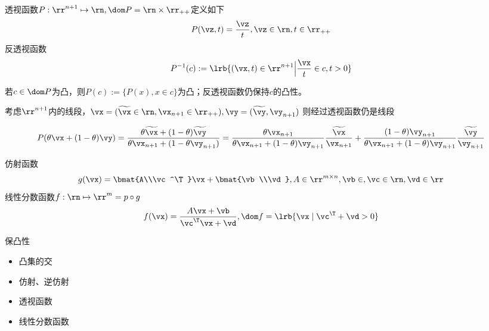 \begin{definition}
透视函数$P:\rr^{n+1}\mapsto\rn,\dom P=\rn\times\rr_{++}$定义如下
\[P(\vz,t)=\dfrac{\vz}{t},\vz\in\rn,t\in\rr_{++}\]
反透视函数
\[P^{-1}(c):=\lrb{(\vx,t)\in\rr^{n+1}\Big|\frac{\vx}{t}\in c,t>0}\]
\end{definition}

若$c\in\dom P$为凸，则$P(c):=\{P(x),x\in c\}$为凸；反透视函数仍保持$c$的凸性。

考虑$\rr^{n+1}$内的线段，$\vx=(\widetilde{\vx}\in\rn,\vx_{n+1}\in\rr_{++}),\vy=(\widetilde{\vy},\vy_{n+1})$
则经过透视函数仍是线段
\begin{analysis}
\[P(\theta \vx+(1-\theta)\vy)=\frac{\theta\widetilde{\vx}+(1-\theta)\widetilde{\vy}}{\theta \vx_{n+1}+(1-\theta \vy_{n+1})}=\frac{\theta \vx_{n+1}}{\theta \vx_{n+1}+(1-\theta)\vy_{n+1}}\frac{\widetilde{\vx}}{\vx_{n+1}}+\frac{(1-\theta)\vy_{n+1}}{\theta \vx_{n+1}+(1-\theta)\vy_{n+1}}\frac{\widetilde{\vy}}{\vy_{n+1}}\]
\end{analysis}

\begin{definition}[线性分数函数]
仿射函数
\[g(\vx)=\bmat{A\\\vc^\T}\vx+\bmat{\vb\\\vd},A\in\rr^{m\times n},\vb\in\rm,\vc\in\rn,\vd\in\rr\]
线性分数函数$f:\rn\mapsto\rr^m=p\circ g$
\[f(\vx)=\frac{A\vx+\vb}{\vc^\T \vx+\vd},\dom f=\lrb{\vx\mid \vc^\T+\vd>0}\]
\end{definition}

保凸性
\begin{itemize}
	\item 凸集的交
	\item 仿射、逆仿射
	\item 透视函数
	\item 线性分数函数
\end{itemize}